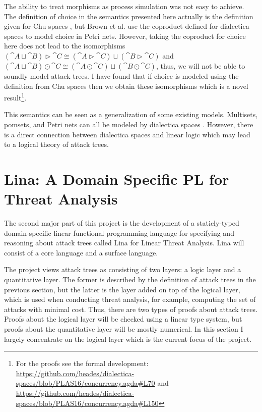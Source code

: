 The ability to treat morphisms as process simulation was not easy to
achieve.  The definition of choice in the semantics presented here
actually is the definition given for Chu spaces \cite{Gupta:1994}, but
Brown et al. use the coproduct defined for dialectica spaces to model
choice in Petri nets.  However, taking the coproduct for choice here
does not lead to the isomorphisms $(\cat{A} \sqcup \cat{B}) \rhd
\cat{C} \cong (\cat{A} \rhd \cat{C}) \sqcup (\cat{B} \rhd \cat{C})$
and $(\cat{A} \sqcup \cat{B}) \odot \cat{C} \cong (\cat{A} \odot
\cat{C}) \sqcup (\cat{B} \odot \cat{C})$, thus, we will not be able to
soundly model attack trees.  I have found that if choice is modeled
using the definition from Chu spaces \cite{Gupta:1994} then we obtain
these isomorphisms which is a novel result\footnote{For the proofs see
  the formal development:
  \url{https://github.com/heades/dialectica-spaces/blob/PLAS16/concurrency.agda\#L70}
  and
  \url{https://github.com/heades/dialectica-spaces/blob/PLAS16/concurrency.agda\#L150}}.

This semantics can be seen as a generalization of some existing
models.  Multisets, pomsets, and Petri nets can all be modeled by
dialectica spaces \cite{Brown:1991,Gupta:1994}.  However, there is a
direct connection between dialectica spaces and linear logic which
may lead to a logical theory of attack trees.

\section{Lina: A Domain Specific PL for Threat Analysis}
\label{sec:lina:_a_domain_specific_pl_for_threat_analysis}

The second major part of this project is the development of a
staticly-typed domain-specific linear functional programming language
for specifying and reasoning about attack trees called Lina for Linear
Threat Analysis.  Lina will consist of a core language and a surface
language.

The project views attack trees as consisting of two layers: a logic
layer and a quantitative layer.  The former is described by the
definition of attack trees in the previous section, but the latter is
the layer added on top of the logical layer, which is used when
conducting threat analysis, for example, computing the set of attacks
with minimal cost.  Thus, there are two types of proofs about attack
trees.  Proofs about the logical layer will be checked using a linear
type system, but proofs about the quantitative layer will be mostly
numerical. In this section I largely concentrate on the logical layer
which is the current focus of the project.

